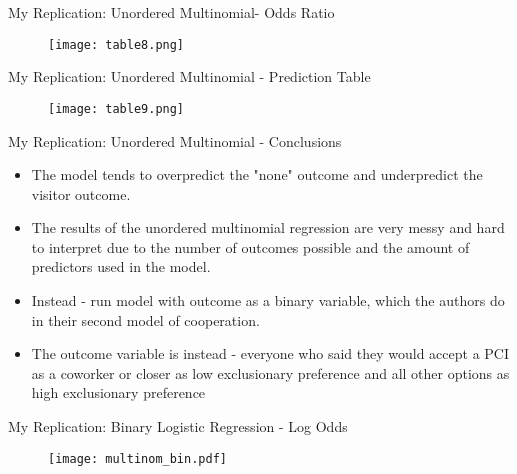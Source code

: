 \documentclass{beamer}
\begin{document}
\begin{frame}{My Replication: Unordered Multinomial- Odds Ratio}
	\vspace{-1.4cm}
	\begin{figure}[htbp]
		\centering
		\texttt{[image: table8.png]} %
		\label{fig:intercepts}
	\end{figure}
\end{frame}

\begin{frame}{My Replication: Unordered Multinomial - Prediction Table}
	\vspace{-1.4cm}
	\begin{figure}[htbp]
		\centering
		\texttt{[image: table9.png]} %
		\label{fig:intercepts}
	\end{figure}
\end{frame}

\begin{frame}{My Replication: Unordered Multinomial - Conclusions}
\begin{itemize}
	\item The model tends to overpredict the "none" outcome and underpredict the visitor outcome.
	\item The results of the unordered multinomial regression are very messy and hard to interpret due to the number of outcomes possible and the amount of predictors used in the model. 
	\item Instead - run model with outcome as a binary variable, which the authors do in their second model of cooperation.
	\item The outcome variable is instead - everyone who said they would accept a PCI as a coworker or closer as low exclusionary preference and all other options as high exclusionary preference
\end{itemize}
\end{frame}


\begin{frame}{My Replication: Binary Logistic Regression - Log Odds}
	\vspace{-1.4cm}
	\begin{figure}[htbp]
		\centering
		\texttt{[image: multinom\_bin.pdf]} %
		\label{fig:intercepts}
	\end{figure}
\end{frame}
\end{document}
